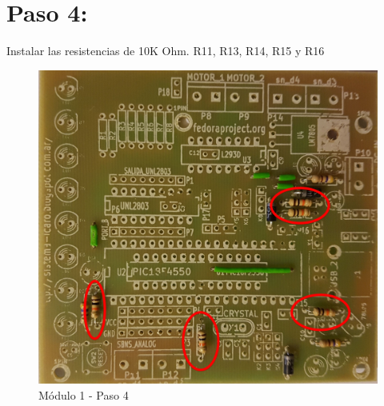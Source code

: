 \newpage

\section{Paso 4:}

Instalar las resistencias de 10K Ohm. R11, R13, R14, R15 y R16

\begin{figure}[h]
	\centering
	\includegraphics[width=0.8\linewidth]{Modulo_1/M1_4}
	\caption{Módulo 1 - Paso 4}
	\label{fig:M1_4}
\end{figure}

